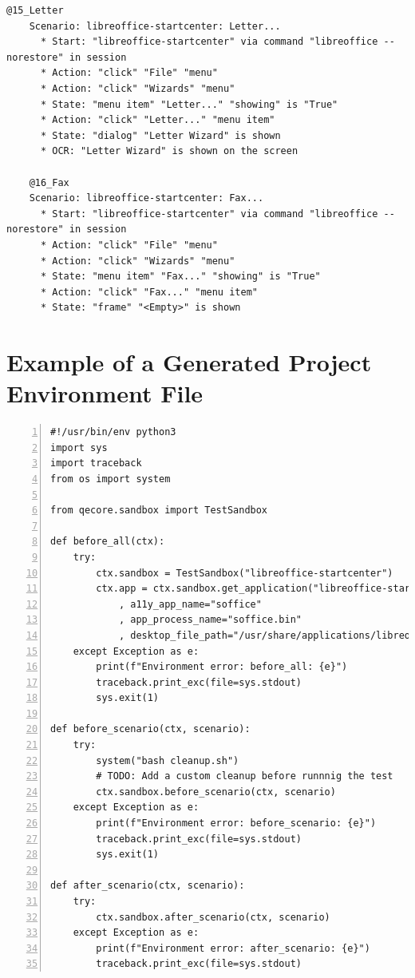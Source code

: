 \begin{lstlisting}[language=Gherkin, caption={Test cases generated for LibreOffice StartCenter}]
    @15_Letter
    Scenario: libreoffice-startcenter: Letter...
      * Start: "libreoffice-startcenter" via command "libreoffice --norestore" in session
      * Action: "click" "File" "menu"
      * Action: "click" "Wizards" "menu"
      * State: "menu item" "Letter..." "showing" is "True"
      * Action: "click" "Letter..." "menu item"
      * State: "dialog" "Letter Wizard" is shown
      * OCR: "Letter Wizard" is shown on the screen
      
    @16_Fax
    Scenario: libreoffice-startcenter: Fax...
      * Start: "libreoffice-startcenter" via command "libreoffice --norestore" in session
      * Action: "click" "File" "menu"
      * Action: "click" "Wizards" "menu"
      * State: "menu item" "Fax..." "showing" is "True"
      * Action: "click" "Fax..." "menu item"
      * State: "frame" "<Empty>" is shown
\end{lstlisting}

\chapter{Example of a Generated Project Environment File }\label{env_example}
\begin{lstlisting}[style=mypython, 
caption={The \texttt{environment.py} file generated by our test generator for LibreOffice StartCenter},
frame=tb,
numbers=left
]
#!/usr/bin/env python3
import sys
import traceback
from os import system

from qecore.sandbox import TestSandbox

def before_all(ctx):
    try:
        ctx.sandbox = TestSandbox("libreoffice-startcenter")
        ctx.app = ctx.sandbox.get_application("libreoffice-startcenter"
            , a11y_app_name="soffice"
			, app_process_name="soffice.bin"
			, desktop_file_path="/usr/share/applications/libreoffice-startcenter.desktop")
    except Exception as e:
        print(f"Environment error: before_all: {e}")
        traceback.print_exc(file=sys.stdout)
        sys.exit(1)

def before_scenario(ctx, scenario):
    try:
        system("bash cleanup.sh")
        # TODO: Add a custom cleanup before runnnig the test
        ctx.sandbox.before_scenario(ctx, scenario)
    except Exception as e:
        print(f"Environment error: before_scenario: {e}")
        traceback.print_exc(file=sys.stdout)
        sys.exit(1)

def after_scenario(ctx, scenario):
    try:
        ctx.sandbox.after_scenario(ctx, scenario)
    except Exception as e:
        print(f"Environment error: after_scenario: {e}")
        traceback.print_exc(file=sys.stdout)
\end{lstlisting}


